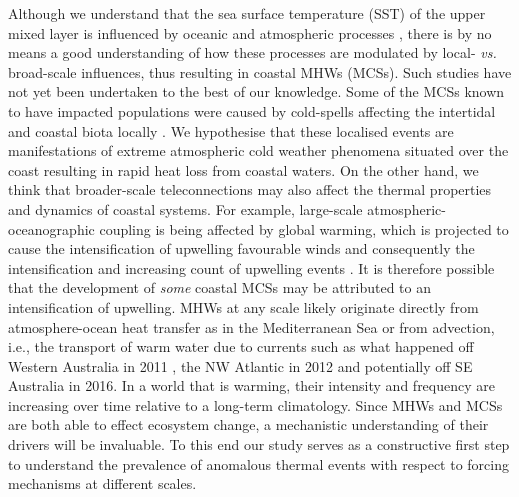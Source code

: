 \documentclass[a4paper,10pt,review]{elsarticle}
\begin{document}
Although we understand that the sea surface temperature (SST) of the upper mixed layer is influenced by oceanic and atmospheric processes \citep[see Equation 1 of][]{Deser2010}, there is by no means a good understanding of how these processes are modulated by local- \emph{vs.} broad-scale influences, thus resulting in coastal MHWs (MCSs). Such studies have not yet been undertaken to the best of our knowledge. Some of the MCSs known to have impacted populations were caused by cold-spells affecting the intertidal and coastal biota locally \citep{Gunter1941, Firth2011}. We hypothesise that these localised events are manifestations of extreme atmospheric cold weather phenomena situated over the coast resulting in rapid heat loss from coastal waters. On the other hand, we think that broader-scale teleconnections may also affect the thermal properties and dynamics of coastal systems. For example, large-scale atmospheric-oceanographic coupling is being affected by global warming, which is projected to cause the intensification of upwelling favourable winds and consequently the intensification and increasing count of upwelling events \citep[see][for a review of this and alternative hypotheses]{Garcia-Reyes2015}. It is therefore possible that the development of \emph{some} coastal MCSs may be attributed to an intensification of upwelling. MHWs at any scale likely originate directly from atmosphere-ocean heat transfer as in the Mediterranean Sea \citep[e.g.][]{Garrabou2009} or from advection, i.e., the transport of warm water due to currents such as what happened off Western Australia in 2011 \citep{Feng2013, Benthuysen2014}, the NW Atlantic in 2012 \citep{Mills2012, Chen2014, Chen2015} and potentially off SE Australia in 2016. In a world that is warming, their intensity and frequency are increasing over time relative to a long-term climatology. Since MHWs and MCSs are both able to effect ecosystem change, a mechanistic understanding of their drivers will be invaluable. To this end our study serves as a constructive first step to understand the prevalence of anomalous thermal events with respect to forcing mechanisms at different scales.
\end{document}
